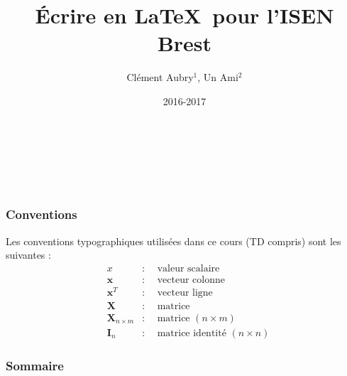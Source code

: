 \documentclass[french,svgnames,10pt]{beamer}
\title{Écrire en \LaTeX\ pour l'ISEN Brest}
\author[C.Aubry, Un.Ami]{Cl\'{e}ment Aubry$^{\text{1}}$, Un Ami$^{\text{2}}$}%
\institute[]{ISEN Brest$^{\text{1}}$, Autre École$^{\text{2}}$}
\date{2016-2017}
\begin{document}
{
 \begin{frame}[plain]
  \vspace*{1cm}
  \begin{center}
   \textcolor{grayisen!30!white}{%
    {\huge{\inserttitle}}\\
    \insertauthor\\
    \insertinstitute\\
    \insertdate}
  \end{center}
 \end{frame}}

\begin{frame}
 \frametitle{Conventions}
 Les conventions typographiques utilisées dans ce cours (TD compris) sont les suivantes :
 \begin{align*}
    & x                      & : & ~~\text{valeur scalaire}                 \\
    & \mathbf{x}             & : & ~~\text{vecteur colonne}                 \\
    & \mathbf{x}^T           & : & ~~\text{vecteur ligne}                   \\
    & \mathbf{X}             & : & ~~\text{matrice}                         \\
    & \mathbf{X}_{n\times m} & : & ~~\text{matrice $(n\times m)$}           \\
    & \mathbf{I}_{n}         & : & ~~\text{matrice identité $(n\times n)$}
 \end{align*}
\end{frame}

\begin{frame}
 \frametitle{Sommaire}
 \null
 \vspace{-1.8cm}
 \tableofcontents[hideallsubsections]
\end{frame}




\end{document}
